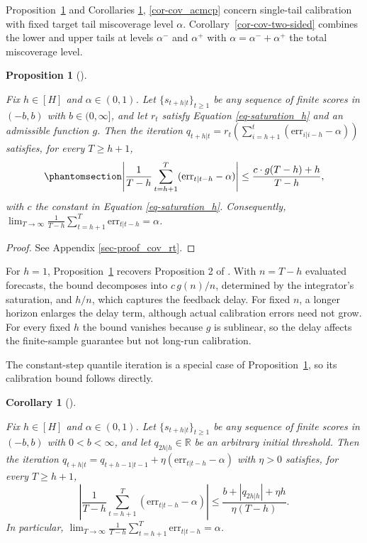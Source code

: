 \documentclass[
  american,
  12pt]{article}
\theoremstyle{plain}
\newtheorem{corollary}{Corollary}[section]
\theoremstyle{plain}
\newtheorem{proposition}{Proposition}[section]
\theoremstyle{remark}
\begin{document}
Proposition~\ref{prp-cov_rt} and Corollaries
\ref{cor-cov_qt}, \ref{cor-cov_acmcp} concern single-tail calibration
with fixed target tail miscoverage level \(\alpha\).
Corollary~\ref{cor-cov-two-sided} combines the lower and upper tails at
levels \(\alpha^{-}\) and \(\alpha^{+}\) with
\(\alpha=\alpha^{-}+\alpha^{+}\) the total miscoverage level.

\begin{proposition}[]\protect\hypertarget{prp-cov_rt}{}\label{prp-cov_rt}

Fix \(h\in[H]\) and \(\alpha\in(0,1)\). Let \(\{s_{t+h|t}\}_{t\geq1}\)
be any sequence of finite scores in \((-b,b)\) with \(b\in(0,\infty]\),
and let \(r_t\) satisfy Equation \eqref{eq-saturation_h} and an
admissible function \(g\). Then the iteration
\(q_{t+h|t}=r_t\left(\sum_{i=h+1}^t(\mathrm{err}_{i|i-h}-\alpha)\right)\)
satisfies, for every \(T\geq h+1\),
\begin{equation}\phantomsection\label{eq-cov_rt}{
\left|\frac{1}{T-h}\sum_{t=h+1}^{T}(\mathrm{err}_{t|t-h}-\alpha)\right| \leq \frac{c \cdot g(T-h) + h}{T-h},
}\end{equation} with \(c\) the constant in Equation
\eqref{eq-saturation_h}. Consequently,
\(\lim_{T\to\infty}\frac{1}{T-h}\sum_{t=h+1}^{T}\mathrm{err}_{t|t-h}=\alpha\).

\end{proposition}

\begin{proof}
See Appendix \ref{sec-proof_cov_rt}.
\end{proof}

For \(h=1\), Proposition~\ref{prp-cov_rt} recovers Proposition 2 of
\citet{angelopoulos2024}. With \(n=T-h\) evaluated forecasts, the bound
decomposes into \(c\,g(n)/n\), determined by the integrator's
saturation, and \(h/n\), which captures the feedback delay. For fixed
\(n\), a longer horizon enlarges the delay term, although actual
calibration errors need not grow. For every fixed \(h\) the bound
vanishes because \(g\) is sublinear, so the delay affects the
finite-sample guarantee but not long-run calibration.

The constant-step quantile iteration is a special case of
Proposition~\ref{prp-cov_rt}, so its calibration bound follows directly.

\begin{corollary}[]\protect\hypertarget{cor-cov_qt}{}\label{cor-cov_qt}

Fix \(h\in[H]\) and \(\alpha\in(0,1)\). Let \(\{s_{t+h|t}\}_{t\geq1}\)
be any sequence of finite scores in \((-b,b)\) with \(0<b<\infty\), and
let \(q_{2h|h}\in\mathbb R\) be an arbitrary initial threshold. Then the
iteration \(q_{t+h|t}=q_{t+h-1|t-1}+\eta(\mathrm{err}_{t|t-h}-\alpha)\)
with \(\eta>0\) satisfies, for every \(T\geq h+1\), \[
\left|\frac{1}{T-h}\sum_{t=h+1}^{T}(\mathrm{err}_{t|t-h}-\alpha)\right| \leq \frac{b+|q_{2h|h}|+\eta h}{\eta(T-h)}.
\] In particular,
\(\lim_{T\to\infty}\frac{1}{T-h}\sum_{t=h+1}^{T}\mathrm{err}_{t|t-h}=\alpha\).

\end{corollary}
\end{document}
